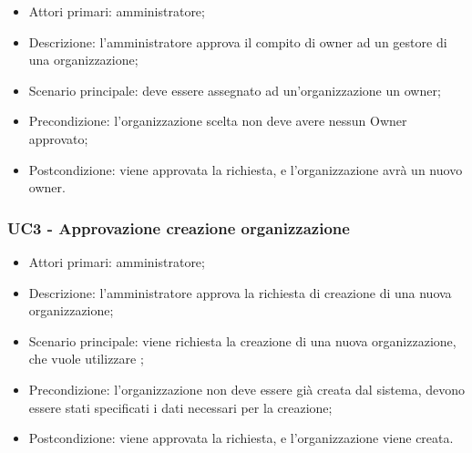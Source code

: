 \begin{itemize}
\item Attori primari: amministratore;
\item Descrizione: l'amministratore approva il compito di owner ad un gestore di una organizzazione;
\item Scenario principale: deve essere assegnato ad un'organizzazione un owner;
\item Precondizione: l'organizzazione scelta non deve avere nessun Owner approvato;
\item Postcondizione: viene approvata la richiesta, e l'organizzazione avrà un nuovo owner.

\end{itemize}

\subsubsection{UC3 - Approvazione creazione organizzazione}

\begin{itemize}
\item Attori primari: amministratore;
\item Descrizione: l'amministratore approva la richiesta di creazione di una nuova organizzazione;
\item Scenario principale: viene richiesta la creazione di una nuova organizzazione, che vuole utilizzare ;
\item Precondizione: l'organizzazione non deve essere già creata dal sistema, devono essere stati specificati i dati necessari per la creazione;
\item Postcondizione: viene approvata la richiesta, e l'organizzazione viene creata.

\end{itemize}